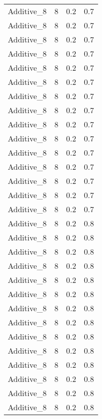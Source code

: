 \documentclass{article}
\begin{document}
\begin{longtable}[H]{lrrr}
 Additive\_8 &       8 &   0.2 &            0.7 \\
 Additive\_8 &       8 &   0.2 &            0.7 \\
 Additive\_8 &       8 &   0.2 &            0.7 \\
 Additive\_8 &       8 &   0.2 &            0.7 \\
 Additive\_8 &       8 &   0.2 &            0.7 \\
 Additive\_8 &       8 &   0.2 &            0.7 \\
 Additive\_8 &       8 &   0.2 &            0.7 \\
 Additive\_8 &       8 &   0.2 &            0.7 \\
 Additive\_8 &       8 &   0.2 &            0.7 \\
 Additive\_8 &       8 &   0.2 &            0.7 \\
 Additive\_8 &       8 &   0.2 &            0.7 \\
 Additive\_8 &       8 &   0.2 &            0.7 \\
 Additive\_8 &       8 &   0.2 &            0.7 \\
 Additive\_8 &       8 &   0.2 &            0.7 \\
 Additive\_8 &       8 &   0.2 &            0.7 \\
 Additive\_8 &       8 &   0.2 &            0.8 \\
 Additive\_8 &       8 &   0.2 &            0.8 \\
 Additive\_8 &       8 &   0.2 &            0.8 \\
 Additive\_8 &       8 &   0.2 &            0.8 \\
 Additive\_8 &       8 &   0.2 &            0.8 \\
 Additive\_8 &       8 &   0.2 &            0.8 \\
 Additive\_8 &       8 &   0.2 &            0.8 \\
 Additive\_8 &       8 &   0.2 &            0.8 \\
 Additive\_8 &       8 &   0.2 &            0.8 \\
 Additive\_8 &       8 &   0.2 &            0.8 \\
 Additive\_8 &       8 &   0.2 &            0.8 \\
 Additive\_8 &       8 &   0.2 &            0.8 \\
 Additive\_8 &       8 &   0.2 &            0.8 \\
 Additive\_8 &       8 &   0.2 &            0.8 \\

\end{longtable}
\end{document}
